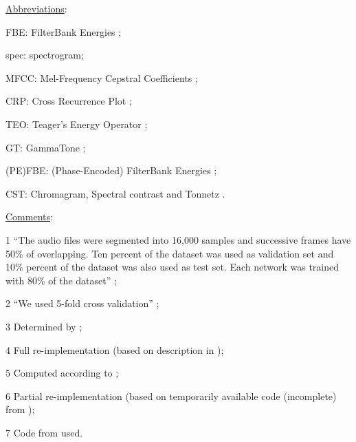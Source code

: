 \documentclass[a4paper,conference]{IEEEtran}
\begin{document}
\begin{table*}[hbt]
\begin{threeparttable}[t]
\begin{tablenotes}
\footnotesize
    \underline{Abbreviations}:\:
    \item FBE: FilterBank Energies \cite{sailor2017convrbm};
    \item spec: spectrogram;
    \item MFCC: Mel-Frequency Cepstral Coefficients \cite{jiang2002spectral};
    \item CRP: Cross Recurrence Plot \cite{marwan2002crp};
    \item TEO: Teager's Energy Operator \cite{kaiser1993teo};
    \item GT: GammaTone \cite{slaney1993gammatone};
    \item (PE)FBE: (Phase-Encoded) FilterBank Energies \cite{tak2017pefbe};
    \item CST: Chromagram, Spectral contrast and Tonnetz \cite{su2019tscnnds}.
\end{tablenotes}
\begin{tablenotes}
\footnotesize
    \underline{Comments}:\:
    \item[1] ``The audio files were segmented into 16,000 samples and successive frames have 50\:\% of overlapping. Ten percent of the dataset was used as validation set and 10\:\% percent of the dataset was also used as test set. Each network was trained with 80\:\% of the dataset''  \cite{abdoli2019cnn1d};
    \item[2] ``We used 5-fold cross validation'' \cite{boddapati2017classifying};
    \item[3] Determined by \cite{zhang2018mixup};
    \item[4] Full re-implementation (based on description in \cite{su2019tscnnds});
    \item[5] Computed according to \cite{su2019tscnnds};
    \item[6] Partial re-implementation (based on temporarily available code (incomplete) from \cite{wang2019tfnet});
    \item[7] Code from \cite{wang2019tfnet} used.
\end{tablenotes}
\end{threeparttable}
\end{table*}
\end{document}
